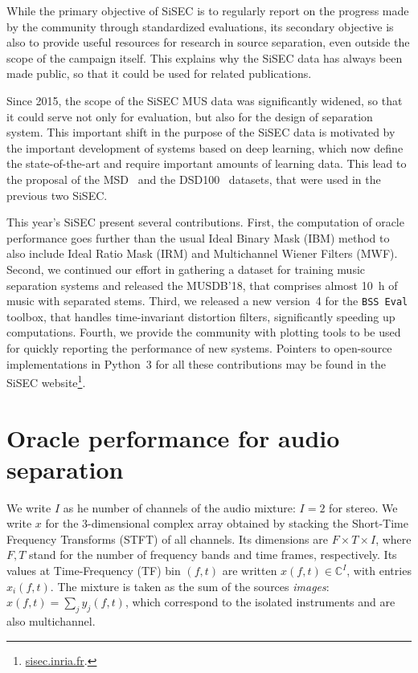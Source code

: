 \documentclass{llncs}
\newcommand{\ft}{\left(f,t\right)}
\begin{document}

While the primary objective of SiSEC is to regularly report on the progress made by the community through standardized evaluations, its secondary objective is also to provide useful resources for research in source separation, even outside the scope of the campaign itself. This explains why the SiSEC data has always been made public, so that it could be used for related publications. %

Since 2015, the scope of the SiSEC MUS data was significantly widened, so that it could serve not only for evaluation, but also for the design of separation system. This important shift in the purpose of the SiSEC data is motivated by the important development of systems based on deep learning, which now define the state-of-the-art and require important amounts of learning data. This lead to the proposal of the MSD~\cite{sisec2015} and the DSD100~\cite{sisec2016} datasets, that were used in the previous two SiSEC.

This year's SiSEC present several contributions. First, the computation of oracle performance goes further than the usual Ideal Binary Mask (IBM) method to also include Ideal Ratio Mask (IRM) and Multichannel Wiener Filters (MWF). Second, we continued our effort in gathering a dataset for training music separation systems and released the MUSDB'18, that comprises almost 10~h of music with separated stems. Third, we released a new version~4 for the \texttt{BSS~Eval} toolbox, that handles time-invariant distortion filters, significantly speeding up computations. Fourth, we provide the community with plotting tools to be used for quickly reporting the performance of new systems. Pointers to open-source implementations in Python~3 for all these contributions may be found in the SiSEC website\footnote{\url{sisec.inria.fr}.}.

\section{Oracle performance for audio separation}
We write $I$ as he number of channels of the audio mixture: $I=2$ for stereo. We write $x$ for the 3-dimensional complex array obtained by stacking the Short-Time Frequency Transforms (STFT) of all channels. Its dimensions are $F\times T\times I$, where $F,T$ stand for the number of frequency bands and time frames, respectively. Its values at Time-Frequency (TF) bin $\ft$ are  written $x\ft\in\mathbb{C}^I$, with entries $x_i\ft$. The mixture is taken as the sum of the sources \textit{images}: $x\ft=\sum_j y_j\ft$, which correspond to the isolated instruments and are also multichannel.
\end{document}
